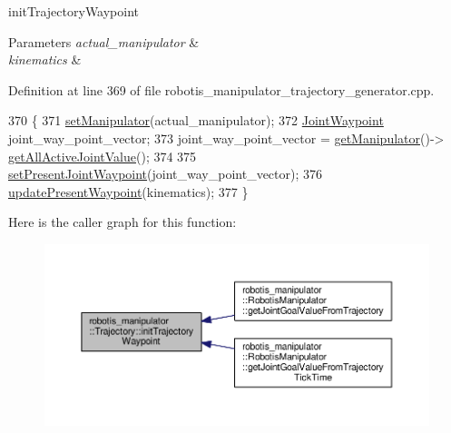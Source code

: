 init\+Trajectory\+Waypoint 


\begin{DoxyParams}{Parameters}
{\em actual\+\_\+manipulator} & \\
\hline
{\em kinematics} & \\
\hline
\end{DoxyParams}


Definition at line 369 of file robotis\+\_\+manipulator\+\_\+trajectory\+\_\+generator.\+cpp.


\begin{DoxyCode}
370 \{
371   \hyperlink{classrobotis__manipulator_1_1_trajectory_a19b2f886aff8fcb4bef369f2a8e0fac0}{setManipulator}(actual\_manipulator);
372   \hyperlink{namespacerobotis__manipulator_a4456fd8b14e1f6b7733a77837dfe9339}{JointWaypoint} joint\_way\_point\_vector;
373   joint\_way\_point\_vector = \hyperlink{classrobotis__manipulator_1_1_trajectory_ae5276de42edf154de107c1f194f6b322}{getManipulator}()->
      \hyperlink{classrobotis__manipulator_1_1_manipulator_ae11f05005b456e13ef17585a70179dce}{getAllActiveJointValue}();
374 
375   \hyperlink{classrobotis__manipulator_1_1_trajectory_a58b1d4fb60f7e3ed9150d312766debc1}{setPresentJointWaypoint}(joint\_way\_point\_vector);
376   \hyperlink{classrobotis__manipulator_1_1_trajectory_a05e95f1473723592130f63321664fb0c}{updatePresentWaypoint}(kinematics);
377 \}
\end{DoxyCode}


Here is the caller graph for this function\+:\nopagebreak
\begin{figure}[H]
\begin{center}
\leavevmode
\includegraphics[width=350pt]{classrobotis__manipulator_1_1_trajectory_addb10c2af208b5e1040a60b7bbf81952_icgraph}
\end{center}
\end{figure}


